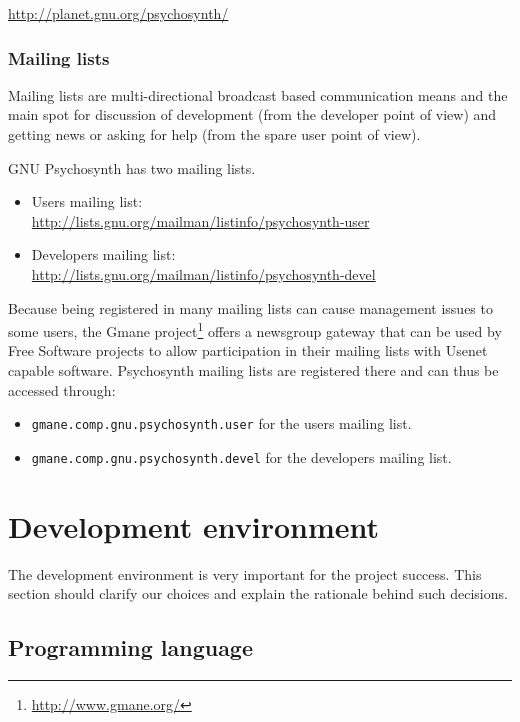 \url{http://planet.gnu.org/psychosynth/}

\subsubsection{Mailing lists}

Mailing lists are multi-directional broadcast based communication
means and the main spot for discussion of development (from the
developer point of view) and getting news or asking for help (from the
spare user point of view).

GNU Psychosynth has two mailing lists.

\begin{itemize}
\item Users mailing list: \\
\url{http://lists.gnu.org/mailman/listinfo/psychosynth-user}

\item Developers mailing list:\\
\url{http://lists.gnu.org/mailman/listinfo/psychosynth-devel}
\end{itemize}

Because being registered in many mailing lists can cause management
issues to some users, the Gmane
project\footnote{\url{http://www.gmane.org/}} offers a newsgroup
gateway that can be used by Free Software projects to allow
participation in their mailing lists with Usenet capable
software. Psychosynth mailing lists are registered there and can thus
be accessed through:

\begin{itemize}
\item \verb|gmane.comp.gnu.psychosynth.user| for the users
  mailing list.
\item \verb|gmane.comp.gnu.psychosynth.devel| for the developers
  mailing list.
\end{itemize}

\section{Development environment}

The development environment is very important for the project
success. This section should clarify our choices and explain the
rationale behind such decisions.

\subsection{Programming language}

